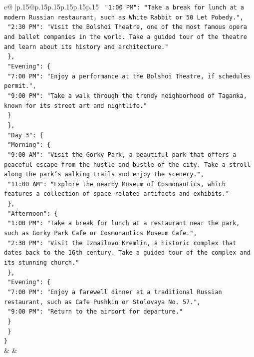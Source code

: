 \documentclass{article}
\begin{document}
{\begin{supertabular}{c@{$\;$}|p{.15\linewidth}@{}p{.15\linewidth}p{.15\linewidth}p{.15\linewidth}p{.15\linewidth}p{.15\linewidth}}
{{{\texttt{      "1:00 PM": "Take a break for lunch at a modern Russian restaurant, such as White Rabbit or 50 Let Pobedy.",} \\
\texttt{      "2:30 PM": "Visit the Bolshoi Theatre, one of the most famous opera and ballet companies in the world. Take a guided tour of the theatre and learn about its history and architecture."} \\
\texttt{    \},} \\
\texttt{    "Evening": \{} \\
\texttt{      "7:00 PM": "Enjoy a performance at the Bolshoi Theatre, if schedules permit.",} \\
\texttt{      "9:00 PM": "Take a walk through the trendy neighborhood of Taganka, known for its street art and nightlife."} \\
\texttt{    \}} \\
\texttt{  \},} \\
\texttt{  "Day 3": \{} \\
\texttt{    "Morning": \{} \\
\texttt{      "9:00 AM": "Visit the Gorky Park, a beautiful park that offers a peaceful escape from the hustle and bustle of the city. Take a stroll along the park's walking trails and enjoy the scenery.",} \\
\texttt{      "11:00 AM": "Explore the nearby Museum of Cosmonautics, which features a collection of space{-}related artifacts and exhibits."} \\
\texttt{    \},} \\
\texttt{    "Afternoon": \{} \\
\texttt{      "1:00 PM": "Take a break for lunch at a restaurant near the park, such as Gorky Park Cafe or Cosmonautics Museum Cafe.",} \\
\texttt{      "2:30 PM": "Visit the Izmailovo Kremlin, a historic complex that dates back to the 16th century. Take a guided tour of the complex and its stunning church."} \\
\texttt{    \},} \\
\texttt{    "Evening": \{} \\
\texttt{      "7:00 PM": "Enjoy a farewell dinner at a traditional Russian restaurant, such as Cafe Pushkin or Stolovaya No. 57.",} \\
\texttt{      "9:00 PM": "Return to the airport for departure."} \\
\texttt{    \}} \\
\texttt{  \}} \\
\texttt{\}} \\
            }
        }
    }
    & & \\ \\


\end{supertabular}}
\end{document}
